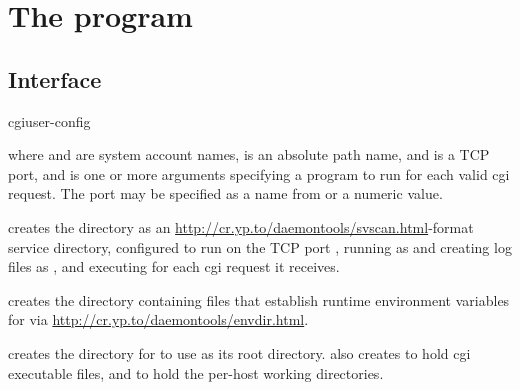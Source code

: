 
\chapter{The  program}

\section{Interface}
\begin{code}
  cgiuser-config     
\end{code}
where  and  are system account names,
 is an absolute path name, and  is a TCP port,
and  is one or more arguments specifying a program to run
for each valid cgi request.  The port may be specified as a name from
 or a numeric value.

 creates the directory  as an
\href{svscan}{http://cr.yp.to/daemontools/svscan.html}-format service
directory, configured to run  on the TCP port
, running  as  and creating log
files as , and executing  for each cgi
request it receives.

 creates the directory 
containing files that establish runtime environment variables for
 via \href{envdir}{http://cr.yp.to/daemontools/envdir.html}.

 creates the directory  for
 to use as its root directory.   also
creates  to hold cgi executable files, and
 to hold the per-host working directories.


